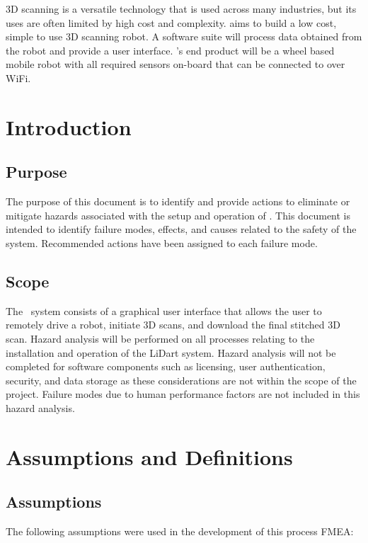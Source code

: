 \documentclass[12pt]{article}
\begin{document}
3D scanning is a versatile technology that is used across many industries, but its uses are often limited by high cost
and complexity. \progname aims to build a low cost, simple to use 3D scanning robot. A software suite will process
data obtained from the robot and provide a user interface. \progname’s end product will be a wheel based mobile robot
with all required sensors on-board that can be connected to over WiFi.

\section{Introduction}

\subsection{Purpose}

The purpose of this document is to identify and provide actions to eliminate or mitigate hazards associated with the setup and operation of \progname. This document is intended to identify failure modes, effects, and causes related to the safety of the system. Recommended actions have been assigned to each failure mode.

\subsection{Scope}
The \progname ~system consists of a graphical user interface that allows the user to remotely drive a robot, initiate 3D scans, and download the final stitched 3D scan. Hazard analysis will be performed on all processes relating to the installation and operation of the LiDart system.  Hazard analysis will not be completed for software components such as licensing, user authentication, security, and data storage as these considerations are not within the scope of the project. Failure modes due to human performance factors are not included in this hazard analysis.

\section{Assumptions and Definitions}

\subsection{Assumptions}

The following assumptions were used in the development of this process FMEA:
\end{document}
